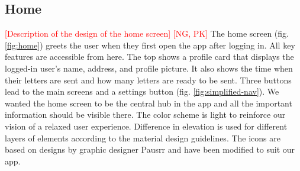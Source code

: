 \documentclass[acmlarge, review=false, screen=true]{acmart}
\begin{document}
    \subsection{Home}
      \textcolor{red}{[Description of the design of the home screen] [NG, PK]} \newline
      The home screen (fig. \ref{fig:home}) greets the user when they first open the app after logging in. All key features are accessible from here. The top shows a profile card that displays the logged-in user’s name, address, and profile picture. It also shows the time when their letters are sent and how many letters are ready to be sent. Three buttons lead to the main screens and a settings button (fig. \ref{fig:simplified-nav}). We wanted the home screen to be the central hub in the app and all the important information should be visible there. The color scheme is light to reinforce our vision of a relaxed user experience. Difference in elevation is used for different layers of elements according to the material design guidelines\cite{materialdesign}. The icons are based on designs by graphic designer Pausrr\cite{pausrr} and have been modified to suit our app.
\end{document}
